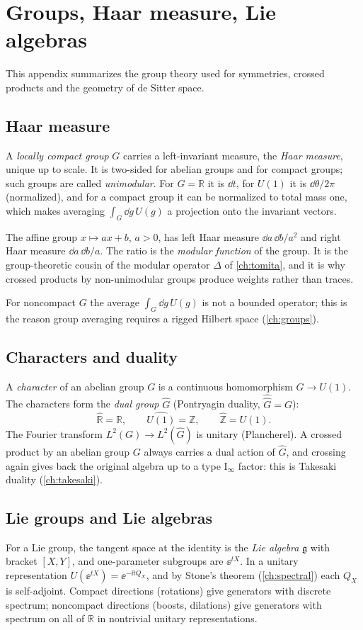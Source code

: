 \chapter{Groups, Haar measure, Lie algebras}\label{app:groups}
This appendix summarizes the group theory used for symmetries, crossed products and the geometry of de Sitter space.

\section{Haar measure}
A \emph{locally compact group} $G$ carries a left-invariant measure, the \emph{Haar measure}, unique up to scale. It is two-sided for abelian groups and for compact groups; such groups are called \emph{unimodular}. For $G=\mathbb R$ it is $\dd t$, for $U(1)$ it is $\dd\theta/2\pi$ (normalized), and for a compact group it can be normalized to total mass one, which makes averaging $\int_G\dd g\,U(g)$ a projection onto the invariant vectors.

\begin{example}
The affine group $x\mapsto ax+b$, $a>0$, has left Haar measure $\dd a\,\dd b/a^2$ and right Haar measure $\dd a\,\dd b/a$. The ratio is the \emph{modular function} of the group. It is the group-theoretic cousin of the modular operator $\Delta$ of \cref{ch:tomita}, and it is why crossed products by non-unimodular groups produce weights rather than traces.
\end{example}
For noncompact $G$ the average $\int_G\dd g\,U(g)$ is not a bounded operator; this is the reason group averaging requires a rigged Hilbert space (\cref{ch:groups}).

\section{Characters and duality}
A \emph{character} of an abelian group $G$ is a continuous homomorphism $G\to U(1)$. The characters form the \emph{dual group} $\hat G$ (Pontryagin duality, $\hat{\hat G}=G$):
\[
\hat{\mathbb R}=\mathbb R,\qquad \hat{U(1)}=\mathbb Z,\qquad \hat{\mathbb Z}=U(1).
\]
The Fourier transform $L^2(G)\to L^2(\hat G)$ is unitary (Plancherel). A crossed product by an abelian group $G$ always carries a dual action of $\hat G$, and crossing again gives back the original algebra up to a type I$_\infty$ factor: this is Takesaki duality (\cref{ch:takesaki}).

\section{Lie groups and Lie algebras}
For a Lie group, the tangent space at the identity is the \emph{Lie algebra} $\mathfrak g$ with bracket $[X,Y]$, and one-parameter subgroups are $\ee^{tX}$. In a unitary representation $U(\ee^{tX})=\ee^{-\ii tQ_X}$, and by Stone's theorem (\cref{ch:spectral}) each $Q_X$ is self-adjoint. Compact directions (rotations) give generators with discrete spectrum; noncompact directions (boosts, dilations) give generators with spectrum on all of $\mathbb R$ in nontrivial unitary representations.

